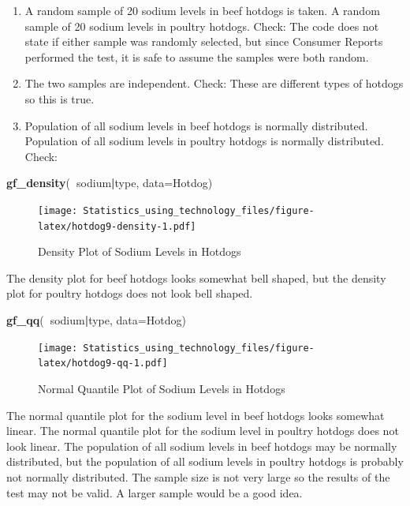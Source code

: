 \documentclass[]{book}
\newenvironment{Shaded}{\begin{snugshade}}{\end{snugshade}}
\newcommand{\DataTypeTok}[1]{\textcolor[rgb]{0.13,0.29,0.53}{#1}}
\newcommand{\KeywordTok}[1]{\textcolor[rgb]{0.13,0.29,0.53}{\textbf{#1}}}
\newcommand{\NormalTok}[1]{#1}
\newcommand{\OperatorTok}[1]{\textcolor[rgb]{0.81,0.36,0.00}{\textbf{#1}}}
\begin{document}
\begin{enumerate}
\def\labelenumi{\alph{enumi}.}
\item
  A random sample of 20 sodium levels in beef hotdogs is taken. A random sample of 20 sodium levels in poultry hotdogs. Check: The code does not state if either sample was randomly selected, but since Consumer Reports performed the test, it is safe to assume the samples were both random.
\item
  The two samples are independent. Check: These are different types of hotdogs so this is true.
\item
  Population of all sodium levels in beef hotdogs is normally distributed. Population of all sodium levels in poultry hotdogs is normally distributed. Check:
\end{enumerate}



\begin{Shaded}
\begin{Highlighting}[]
\KeywordTok{gf_density}\NormalTok{(}\OperatorTok{~}\NormalTok{sodium}\OperatorTok{|}\NormalTok{type, }\DataTypeTok{data=}\NormalTok{Hotdog)}
\end{Highlighting}
\end{Shaded}

\begin{figure}
\centering
\texttt{[image: Statistics\_using\_technology\_files/figure-latex/hotdog9-density-1.pdf]}
\caption{\label{fig:hotdog9-density}Density Plot of Sodium Levels in Hotdogs}
\end{figure}

The density plot for beef hotdogs looks somewhat bell shaped, but the density plot for poultry hotdogs does not look bell shaped.



\begin{Shaded}
\begin{Highlighting}[]
\KeywordTok{gf_qq}\NormalTok{(}\OperatorTok{~}\NormalTok{sodium}\OperatorTok{|}\NormalTok{type, }\DataTypeTok{data=}\NormalTok{Hotdog)}
\end{Highlighting}
\end{Shaded}

\begin{figure}
\centering
\texttt{[image: Statistics\_using\_technology\_files/figure-latex/hotdog9-qq-1.pdf]}
\caption{\label{fig:hotdog9-qq}Normal Quantile Plot of Sodium Levels in Hotdogs}
\end{figure}

The normal quantile plot for the sodium level in beef hotdogs looks somewhat linear. The normal quantile plot for the sodium level in poultry hotdogs does not look linear. The population of all sodium levels in beef hotdogs may be normally distributed, but the population of all sodium levels in poultry hotdogs is probably not normally distributed. The sample size is not very large so the results of the test may not be valid. A larger sample would be a good idea.
\end{document}
